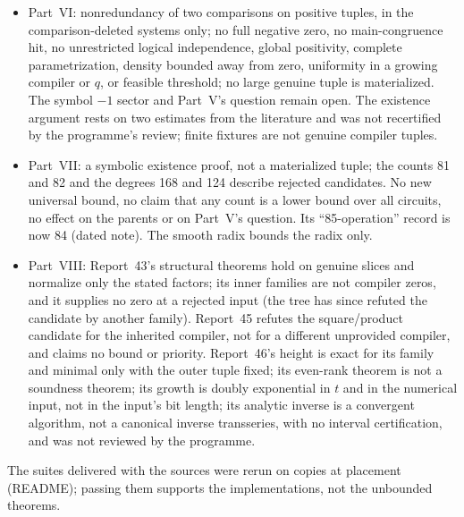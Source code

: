 \documentclass[11pt,letterpaper]{article}
\newcommand{\fupR}{0}
\renewcommand{\thesection}{\fupR.\arabic{section}}
\renewcommand{\theHsection}{\fupR.\arabic{section}}
\newcommand{\fupstart}[2]{%
  \renewcommand{\fupR}{#1}\setcounter{section}{0}\setcounter{equation}{0}%
  \renewcommand{\thesection}{\fupR.\arabic{section}}%
  \renewcommand{\theHsection}{\fupR.\arabic{section}}%
  \renewcommand{\fuphead}{#2}}
\newcommand{\fuphead}{Front matter}
\theoremstyle{definition}\newtheorem{definition}[theorem]{Definition}
\theoremstyle{remark}\newtheorem{remark}[theorem]{Remark}
\begin{document}
\begin{itemize}
\item Part~VI: nonredundancy of two comparisons on positive tuples, in the comparison-deleted systems only; no full negative zero, no main-congruence hit, no unrestricted logical independence, global positivity, complete parametrization, density bounded away from zero, uniformity in a growing compiler or $q$, or feasible threshold; no large genuine tuple is materialized. The symbol $-1$ sector and Part~V's question remain open. The existence argument rests on two estimates from the literature and was not recertified by the programme's review; finite fixtures are not genuine compiler tuples.
\item Part~VII: a symbolic existence proof, not a materialized tuple; the counts 81 and 82 and the degrees 168 and 124 describe rejected candidates. No new universal bound, no claim that any count is a lower bound over all circuits, no effect on the parents or on Part~V's question. Its ``85-operation'' record is now 84 (dated note). The smooth radix bounds the radix only.
\item Part~VIII: Report~43's structural theorems hold on genuine slices and normalize only the stated factors; its inner families are not compiler zeros, and it supplies no zero at a rejected input (the tree has since refuted the candidate by another family). Report~45 refutes the square/product candidate for the inherited compiler, not for a different unprovided compiler, and claims no bound or priority. Report~46's height is exact for its family and minimal only with the outer tuple fixed; its even-rank theorem is not a soundness theorem; its growth is doubly exponential in $t$ and in the numerical input, not in the input's bit length; its analytic inverse is a convergent algorithm, not a canonical inverse transseries, with no interval certification, and was not reviewed by the programme.
\end{itemize}
The suites delivered with the sources were rerun on copies at placement (README); passing them supports the implementations, not the unbounded theorems.

\clearpage
\fupstart{23}{Part I: Report 23 revision 1}
\end{document}
